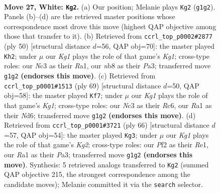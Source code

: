 \documentclass[11pt]{article}
\begin{document}
\clearpage

\begin{figure}[p]\centering
\begin{subfigure}{0.46\textwidth}\centering
\resizebox{\linewidth}{!}{%
\newchessgame
\chessboard[
  setfen={rn6/3bk3/1p2p3/p3P3/P4pr1/1PNB2P1/5P2/R2R2K1 w - - 0 27},
  showmover=false,
  pgfstyle=straightmove, color=movearrow, markmove={g1-g2}
]}
\caption{}
\end{subfigure}\hfill
\begin{subfigure}{0.46\textwidth}\centering
\resizebox{\linewidth}{!}{%
\newchessgame
\chessboard[
  setfen={4r1k1/6p1/pBpr1p2/7p/1P4P1/P3Pb1P/5P2/R3R1K1 w - - 0 26},
  showmover=false,
  pgfstyle=straightmove, color=movearrow, markmove={g1-h2}
]}
\caption{}
\end{subfigure}
\\[4pt]
\begin{subfigure}{0.46\textwidth}\centering
\resizebox{\linewidth}{!}{%
\newchessgame
\chessboard[
  setfen={2r3k1/1p4p1/2rn1p1p/3R4/n2B2PP/P1p1P3/2R1KP2/1N6 b - - 0 35},
  showmover=false,
  pgfstyle=straightmove, color=movearrow, markmove={g8-f7}
]}
\caption{}
\end{subfigure}\hfill
\begin{subfigure}{0.46\textwidth}\centering
\resizebox{\linewidth}{!}{%
\newchessgame
\chessboard[
  setfen={2b1rk2/1p5p/1r2P1p1/3p1pP1/p2N3P/P2P4/1P2R1K1/4R3 w - - 1 34},
  showmover=false,
  pgfstyle=straightmove, color=movearrow, markmove={g2-g3}
]}
\caption{}
\end{subfigure}
\caption{\textbf{Move 27, White: \texttt{Kg2}.} (a) Our position; Melanie plays \texttt{Kg2} (\texttt{g1g2}). Panels (b)--(d) are the retrieved master positions whose correspondence most drove this move (highest QAP objective among those that transfer to it). (b) Retrieved from \texttt{ccrl\_top\_p0002\#2877} (ply 50) [structural distance $d$=56, QAP obj=70]: the master played \texttt{Kh2}; under $\mu$ our \emph{Kg1} plays the role of that game's \emph{Kg1}; cross-type roles: our \emph{N}c3 as their \emph{R}a1, our \emph{n}b8 as their \emph{P}a3; transferred move \texttt{g1g2} \textbf{(endorses this move)}. (c) Retrieved from \texttt{ccrl\_top\_p0001\#1513} (ply 69) [structural distance $d$=50, QAP obj=58]: the master played \texttt{Kf7}; under $\mu$ our \emph{Kg1} plays the role of that game's \emph{Kg1}; cross-type roles: our \emph{N}c3 as their \emph{R}c6, our \emph{R}a1 as their \emph{N}d6; transferred move \texttt{g1g2} \textbf{(endorses this move)}. (d) Retrieved from \texttt{ccrl\_top\_p0001\#3721} (ply 66) [structural distance $d$=57, QAP obj=54]: the master played \texttt{Kg3}; under $\mu$ our \emph{Kg1} plays the role of that game's \emph{Kg2}; cross-type roles: our \emph{P}f2 as their \emph{R}e1, our \emph{R}a1 as their \emph{P}a3; transferred move \texttt{g1g2} \textbf{(endorses this move)}. Synthesis: 5 retrieved analogs transferred to \texttt{Kg2} (summed QAP objective 215, the strongest correspondence among the candidate moves); Melanie committed it via the \texttt{search} selector.}
\label{fig:thought-m52}
\end{figure}
\end{document}
